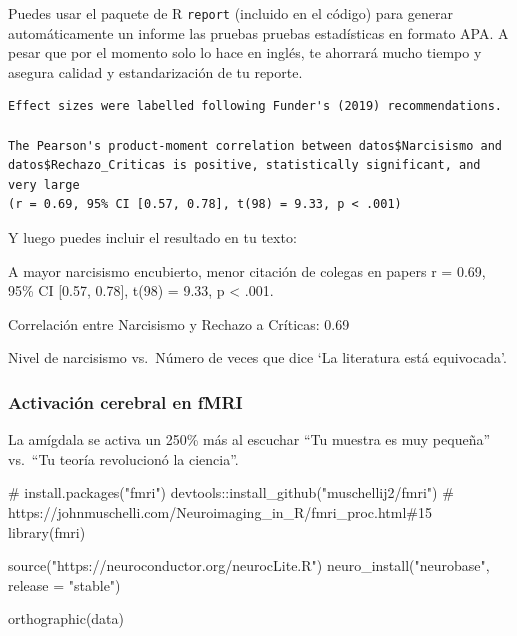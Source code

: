 \documentclass[
]{article}
\newenvironment{Shaded}{\begin{snugshade}}{\end{snugshade}}
\newcommand{\AttributeTok}[1]{\textcolor[rgb]{0.40,0.45,0.13}{#1}}
\newcommand{\CommentTok}[1]{\textcolor[rgb]{0.37,0.37,0.37}{#1}}
\newcommand{\FunctionTok}[1]{\textcolor[rgb]{0.28,0.35,0.67}{#1}}
\newcommand{\NormalTok}[1]{\textcolor[rgb]{0.00,0.23,0.31}{#1}}
\newcommand{\SpecialCharTok}[1]{\textcolor[rgb]{0.37,0.37,0.37}{#1}}
\newcommand{\StringTok}[1]{\textcolor[rgb]{0.13,0.47,0.30}{#1}}
\begin{document}
\begin{tcolorbox}[enhanced jigsaw, leftrule=.75mm, toprule=.15mm, colbacktitle=quarto-callout-tip-color!10!white, arc=.35mm, titlerule=0mm, coltitle=black, breakable, toptitle=1mm, bottomtitle=1mm, left=2mm, title=\textcolor{quarto-callout-tip-color}{\faLightbulb}\hspace{0.5em}{Tip}, colframe=quarto-callout-tip-color-frame, rightrule=.15mm, bottomrule=.15mm, opacitybacktitle=0.6, opacityback=0, colback=white]

Puedes usar el paquete de R \texttt{report} (incluido en el código) para
generar automáticamente un informe las pruebas pruebas estadísticas en
formato APA. A pesar que por el momento solo lo hace en inglés, te
ahorrará mucho tiempo y asegura calidad y estandarización de tu reporte.

\begin{verbatim}
Effect sizes were labelled following Funder's (2019) recommendations.

The Pearson's product-moment correlation between datos$Narcisismo and
datos$Rechazo_Criticas is positive, statistically significant, and very large
(r = 0.69, 95% CI [0.57, 0.78], t(98) = 9.33, p < .001)
\end{verbatim}

Y luego puedes incluir el resultado en tu texto:

A mayor narcisismo encubierto, menor citación de colegas en papers r =
0.69, 95\% CI {[}0.57, 0.78{]}, t(98) = 9.33, p \textless{} .001.

\end{tcolorbox}

Correlación entre Narcisismo y Rechazo a Críticas: 0.69

Nivel de narcisismo vs.~Número de veces que dice `La literatura está
equivocada'.

\subsubsection{Activación cerebral en
fMRI}\label{activaciuxf3n-cerebral-en-fmri}

La amígdala se activa un 250\% más al escuchar ``Tu muestra es muy
pequeña'' vs.~``Tu teoría revolucionó la ciencia''.

\begin{Shaded}
\begin{Highlighting}[]
\CommentTok{\# install.packages("fmri")}
\NormalTok{devtools}\SpecialCharTok{::}\FunctionTok{install\_github}\NormalTok{(}\StringTok{"muschellij2/fmri"}\NormalTok{)}
\CommentTok{\# https://johnmuschelli.com/Neuroimaging\_in\_R/fmri\_proc.html\#15}
\FunctionTok{library}\NormalTok{(fmri)}

\FunctionTok{source}\NormalTok{(}\StringTok{"https://neuroconductor.org/neurocLite.R"}\NormalTok{)}
\FunctionTok{neuro\_install}\NormalTok{(}\StringTok{"neurobase"}\NormalTok{, }\AttributeTok{release =} \StringTok{"stable"}\NormalTok{)}

\FunctionTok{orthographic}\NormalTok{(data)}
\end{Highlighting}
\end{Shaded}
\end{document}
